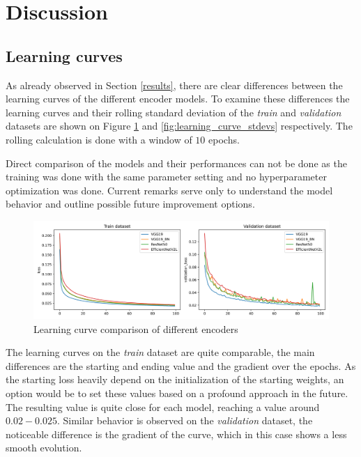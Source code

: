 \section{Discussion} \label{discussion}
\subsection{Learning curves}
As already observed in Section \ref{results}, there are clear differences between the
learning curves of the different encoder models.
To examine these differences the learning curves and their rolling standard deviation
of the \emph{train} and \emph{validation} datasets are shown on
Figure \ref{fig:learning_curves} and \ref{fig:learning_curve_stdevs} respectively.
The rolling calculation is done with a window of $10$ epochs.

Direct comparison of the models and their performances can not be done as the training
was done with the same parameter setting and no hyperparameter optimization was done.
Current remarks serve only to understand the model behavior and outline possible future
improvement options.

\begin{figure}[H]
    \centering
    \includegraphics[width=\textwidth]{./results/comparison/learning_curves.png}
    \caption{Learning curve comparison of different encoders}
    \label{fig:learning_curves}
\end{figure}

The learning curves on the \emph{train} dataset are quite comparable, the main differences are
the starting and ending value and the gradient over the epochs.
As the starting loss heavily depend on the initialization of the starting weights, an option
would be to set these values based on a profound approach in the future.
The resulting value is quite close for each model, reaching a value around $0.02 - 0.025$.
Similar behavior is observed on the \emph{validation} dataset, the noticeable
difference is the gradient of the curve, which in this case shows a less smooth evolution.

